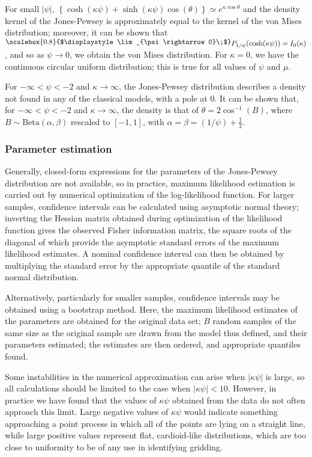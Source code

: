 \documentclass[../../ArchStats.tex]{subfiles}
\newcommand{\Lim}[1]{\raisebox{0.5ex}{\scalebox{0.8}{$\displaystyle \lim_{#1}\;$}}}
\begin{document}
For small $\vert \psi \vert$, $\left\lbrace \cosh(\kappa\psi) + \sinh(\kappa\psi) \cos(\theta) \right\rbrace \simeq e^{\kappa \cos \theta}$ and the density kernel of the Jones-Pewsey is approximately equal to the kernel of the von Mises distribution; moreover, it can be shown that $\Lim{\psi \rightarrow 0} P_{1/\psi}(\cosh(\kappa\psi)) = I_0(\kappa)$, and so as $\psi \rightarrow 0$, we obtain the von Mises distribution. For $\kappa = 0$, we have the continuous circular uniform distribution; this is true for all values of $\psi$ and $\mu$.

For $-\infty < \psi < -2$ and $\kappa \rightarrow \infty$, the Jones-Pewsey distribution describes a density not found in any of the classical models, with a pole at 0. It can be shown that, for $-\infty < \psi < -2$ and $\kappa \rightarrow \infty$, the density is that of $\theta = 2 \cos^{-1}(B)$, where $B \sim \text{Beta}(\alpha, \beta)$ rescaled to  $[-1,1]$, with $\alpha = \beta = (1/\psi) + \frac{1}{2}$.


\subsubsection{Parameter estimation}
\label{sec:JP-params}

Generally, closed-form expressions for the parameters of the Jones-Pewsey distribution are not available, so in practice, maximum likelihood estimation is carried out by numerical optimization of the log-likelihood function. For larger samples, confidence intervals can be calculated using asymptotic normal theory; inverting the Hessian matrix obtained during optimization of the likelihood function gives the observed Fisher information matrix, the square roots of the diagonal of which provide the asymptotic standard errors of the maximum likelihood estimates. A nominal confidence interval can then be obtained by multiplying the standard error by the appropriate quantile of the standard normal distribution.

Alternatively, particularly for smaller samples, confidence intervals may be obtained using a bootstrap method. Here, the maximum likelihood estimates of the parameters are obtained for the original data set; $B$ random samples of the same size as the original sample are drawn from the model thus defined, and their parameters estimated; the estimates are then ordered, and appropriate quantiles found.

Some instabilities in the numerical approximation can arise when $\vert \kappa \psi \vert$ is large, so all calculations should be limited to the case when $\vert \kappa \psi \vert < 10$. However, in practice we have found that the values of $\kappa \psi$ obtained from the data do not often approach this limit. Large negative values of $\kappa \psi$ would indicate something approaching a point process in which all of the points are lying on a straight line, while large positive values represent flat, cardioid-like distributions, which are too close to uniformity to be of any use in identifying gridding.
\end{document}
